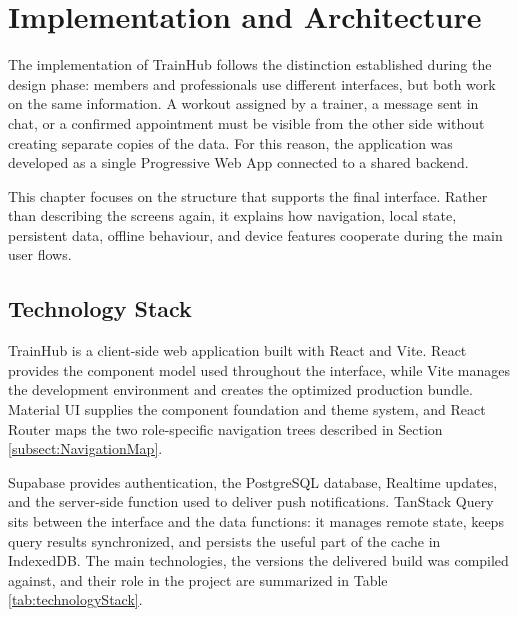 \section{Implementation and Architecture}\label{sect:ImplementationArchitecture}

The implementation of TrainHub follows the distinction established during the design phase: members and professionals use different interfaces, but both work on the same information. A workout assigned by a trainer, a message sent in chat, or a confirmed appointment must be visible from the other side without creating separate copies of the data. For this reason, the application was developed as a single Progressive Web App connected to a shared backend.

This chapter focuses on the structure that supports the final interface. Rather than describing the screens again, it explains how navigation, local state, persistent data, offline behaviour, and device features cooperate during the main user flows.

\subsection{Technology Stack}\label{subsect:TechnologyStack}

TrainHub is a client-side web application built with React and Vite. React provides the component model used throughout the interface, while Vite manages the development environment and creates the optimized production bundle. Material UI supplies the component foundation and theme system, and React Router maps the two role-specific navigation trees described in Section \ref{subsect:NavigationMap}.

Supabase provides authentication, the PostgreSQL database, Realtime updates, and the server-side function used to deliver push notifications. TanStack Query sits between the interface and the data functions: it manages remote state, keeps query results synchronized, and persists the useful part of the cache in IndexedDB. The main technologies, the versions the delivered build was compiled against, and their role in the project are summarized in Table \ref{tab:technologyStack}.

